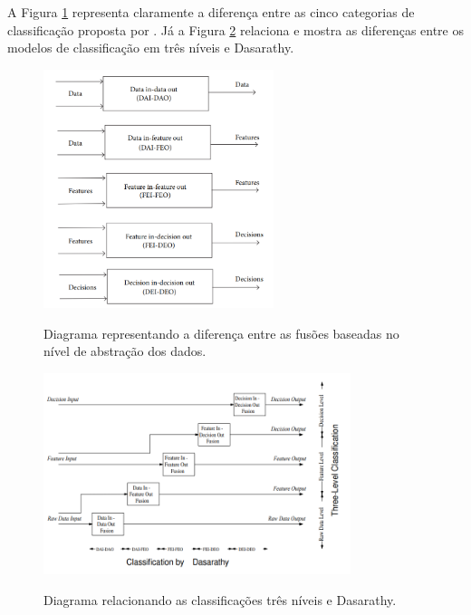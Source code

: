 \documentclass[acronym, symbols, table]{fei}
\begin{document}
				A Figura \ref{fig:classificacao_2_fusao_de_sensores} representa claramente a diferença entre as cinco categorias de classificação proposta por \textcite{dasarathy1997sensor}. Já a Figura \ref{fig:classificacao_3_fusao_de_sensores} relaciona e mostra as diferenças entre os modelos de classificação em três níveis e Dasarathy.
			
				\begin{figure}[!htb]
					\centering
					\caption{Diagrama representando a diferença entre as fusões baseadas no nível de abstração dos dados.} 
					\includegraphics[width=0.6\textwidth]{classificacao_2_fusao_de_sensores.png}
					\label{fig:classificacao_2_fusao_de_sensores}
				\end{figure}
			
				\begin{figure}[!htb]
					\centering
					\caption{Diagrama relacionando as classificações três níveis e Dasarathy.} 
					\includegraphics[width=0.8\textwidth]{classificacao_3_fusao_de_sensores.png}
					\label{fig:classificacao_3_fusao_de_sensores}
				\end{figure}
	
\end{document}
